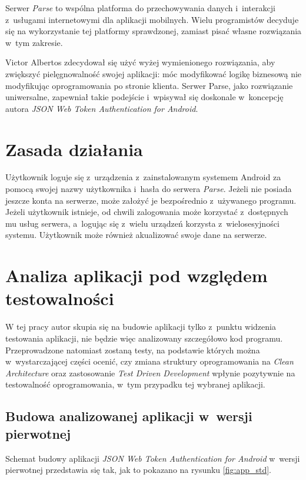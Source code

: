 Serwer \textit{Parse} to wspólna platforma do przechowywania danych i~interakcji z~usługami internetowymi dla aplikacji mobilnych. Wielu programistów decyduje się na wykorzystanie tej platformy sprawdzonej, zamiast pisać własne rozwiązania w~tym zakresie.

Victor Albertos zdecydował się użyć wyżej wymienionego rozwiązania, aby zwiększyć pielęgnowalność swojej aplikacji: móc modyfikować logikę biznesową nie modyfikując oprogramowania po stronie klienta. Serwer Parse, jako rozwiązanie uniwersalne, zapewniał takie podejście i~wpisywał się doskonale w~koncepcję autora \textit{JSON Web Token Authentication for Android}.

\section{Zasada działania}
Użytkownik loguje się z~urządzenia z~zainstalowanym systemem Android za pomocą swojej nazwy użytkownika i~hasła do serwera \textit{Parse}. Jeżeli nie posiada jeszcze konta na serwerze, może założyć je bezpośrednio z~używanego programu. Jeżeli użytkownik istnieje, od chwili zalogowania może korzystać z~dostępnych mu usług serwera, a~logując się z~wielu urządzeń korzysta z~wielosesyjności systemu.  Użytkownik może również akualizować swoje dane na serwerze.

\section{Analiza aplikacji pod względem testowalności}
W tej pracy autor skupia się na budowie aplikacji tylko z~punktu widzenia testowania aplikacji, nie będzie więc analizowany szczegółowo kod programu. Przeprowadzone natomiast zostaną testy, na podstawie których można w~wystarczającej części ocenić, czy zmiana struktury oprogramowania na \textit{Clean Architecture} oraz zastosowanie  \textit{Test Driven Development} wpłynie pozytywnie na testowalność oprogramowania, w~tym przypadku tej wybranej aplikacji.

\newpage
\subsection{Budowa analizowanej aplikacji w~wersji pierwotnej}
Schemat budowy aplikacji \textit{JSON Web Token Authentication for Android} w~wersji pierwotnej przedstawia się tak, jak to pokazano na rysunku \ref{fig:app_std}.

